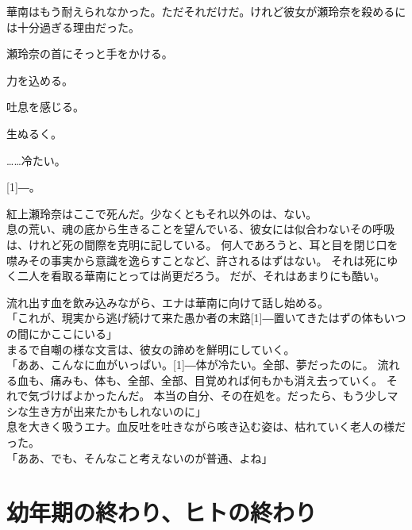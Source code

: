\documentclass[autodetect-engine,dvipdfmx-if-dvi,a5paper,ja=standard,twoside,titlepage,final,twocolumn]{ltjtbook}
\begin{document}
華南はもう耐えられなかった。ただそれだけだ。けれど彼女が瀬玲奈を殺めるには十分過ぎる理由だった。

瀬玲奈の首にそっと手をかける。

力を込める。

吐息を感じる。

生ぬるく。

……冷たい。

\scalebox{3}[1]{―}。

紅上瀬玲奈はここで死んだ。少なくともそれ以外のは、ない。\\

息の荒い、魂の底から生きることを望んでいる、彼女には似合わないその呼吸は、けれど死の間際を克明に記している。
何人であろうと、耳と目を閉じ口を噤みその事実から意識を逸らすことなど、許されるはずはない。
それは死にゆく二人を看取る華南にとっては尚更だろう。
だが、それはあまりにも酷い。

流れ出す血を飲み込みながら、エナは華南に向けて話し始める。\\
「これが、現実から逃げ続けて来た愚か者の末路\scalebox{3}[1]{―}置いてきたはずの体もいつの間にかここにいる」\\
まるで自嘲の様な文言は、彼女の諦めを鮮明にしていく。\\
「ああ、こんなに血がいっぱい。\scalebox{3}[1]{―}体が冷たい。全部、夢だったのに。
流れる血も、痛みも、体も、全部、全部、目覚めれば何もかも消え去っていく。
それで気づけばよかったんだ。
本当の自分、その在処を。だったら、もう少しマシな生き方が出来たかもしれないのに」\\
息を大きく吸うエナ。血反吐を吐きながら咳き込む姿は、枯れていく老人の様だった。\\
「ああ、でも、そんなこと考えないのが普通、よね」\\


\chapter{\rm 幼年期の終わり、ヒトの終わり}
\end{document}

